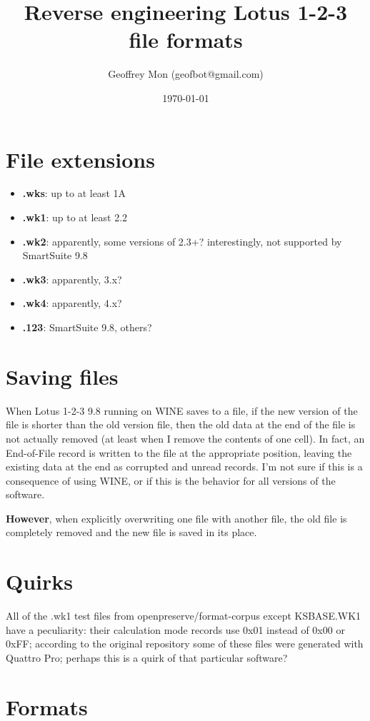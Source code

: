 \documentclass{article}
\title{Reverse engineering Lotus 1-2-3 file formats}
\author{Geoffrey Mon (geofbot@gmail.com)}
\date{\today}
\begin{document}
\maketitle

\section{File extensions}
\begin{itemize}
\item \textbf{.wks}: up to at least 1A
\item \textbf{.wk1}: up to at least 2.2
\item \textbf{.wk2}: apparently, some versions of 2.3+?
  interestingly, not supported by SmartSuite 9.8
\item \textbf{.wk3}: apparently, 3.x?
\item \textbf{.wk4}: apparently, 4.x?
\item \textbf{.123}: SmartSuite 9.8, others?
\end{itemize}

\section{Saving files}
When Lotus 1-2-3 9.8 running on WINE saves to a file, if
the new version of the file is shorter
than the old version file, then the old
data at the end of the file is not actually removed
(at least when I remove the contents of one cell).
In fact, an End-of-File record is written to the file at the
appropriate position, leaving the existing data at the end
as corrupted and unread records.
I'm not sure if this is a consequence of using WINE,
or if this is the behavior for all versions of the software.

\textbf{However}, when explicitly overwriting one file with
another file, the old file is completely removed and
the new file is saved in its place.

\section{Quirks}
All of the .wk1
test files from openpreserve/format-corpus
except KSBASE.WK1 have a peculiarity:
their calculation mode records use 0x01 instead of 0x00 or 0xFF;
according to the original repository some of these
files were generated with Quattro Pro;
perhaps this is a quirk of that particular software?

\section{Formats}
\end{document}
